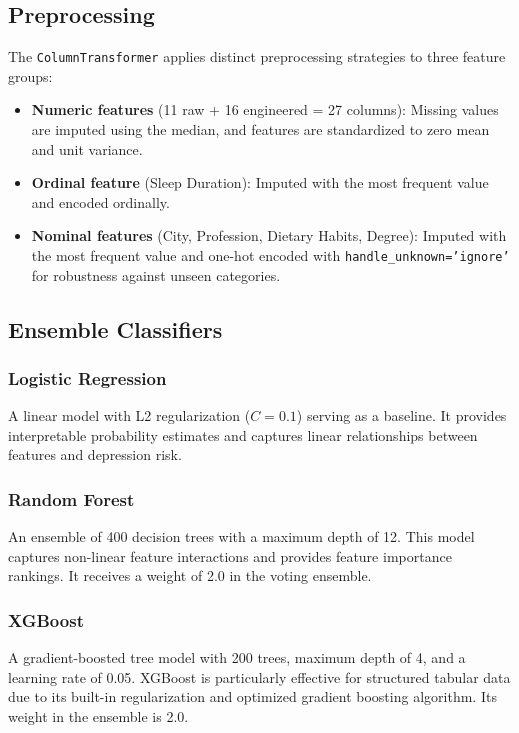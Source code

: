 \documentclass[11pt,a4paper]{article}
\begin{document}
\subsection{Preprocessing}

The \texttt{ColumnTransformer} applies distinct preprocessing strategies to three feature groups:

\begin{itemize}[leftmargin=*,nosep]
    \item \textbf{Numeric features} (11 raw + 16 engineered = 27 columns): Missing values are imputed using the median, and features are standardized to zero mean and unit variance.
    \item \textbf{Ordinal feature} (Sleep Duration): Imputed with the most frequent value and encoded ordinally.
    \item \textbf{Nominal features} (City, Profession, Dietary Habits, Degree): Imputed with the most frequent value and one-hot encoded with \texttt{handle\_unknown='ignore'} for robustness against unseen categories.
\end{itemize}

\nopagebreak
\subsection{Ensemble Classifiers}

\subsubsection{Logistic Regression}
A linear model with L2 regularization ($C=0.1$) serving as a baseline. It provides interpretable probability estimates and captures linear relationships between features and depression risk.

\subsubsection{Random Forest}
An ensemble of 400 decision trees with a maximum depth of 12. This model captures non-linear feature interactions and provides feature importance rankings. It receives a weight of 2.0 in the voting ensemble.

\subsubsection{XGBoost}
A gradient-boosted tree model with 200 trees, maximum depth of 4, and a learning rate of 0.05. XGBoost is particularly effective for structured tabular data due to its built-in regularization and optimized gradient boosting algorithm. Its weight in the ensemble is 2.0.
\end{document}
